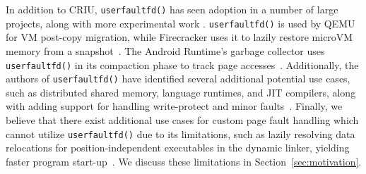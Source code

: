 


In addition to CRIU, \texttt{userfaultfd()} has seen adoption in a number of large projects, along with more experimental work \cite{zIO, LightSwap, file-backed-article, file-backed-proceeding, uffd-security-framework-paper, TrailDB}. \texttt{userfaultfd()} is used by QEMU for VM post-copy migration, while Firecracker uses it to lazily restore microVM memory from a snapshot~\cite{firecracker}. The Android Runtime's garbage collector uses \texttt{userfaultfd()} in its compaction phase to track page accesses~\cite{Android_13_AOSP, garbage_collection_paper}.
Additionally, the authors of \texttt{userfaultfd()} have identified several additional potential use cases, such as distributed shared memory, language runtimes, and JIT compilers, along with adding support for handling write-protect and minor faults~\cite{LWN_Write-protect, LWN_next_step, LPC-presentation, uffd_presentation}.
Finally, we believe that there exist additional use cases for custom page fault handling which cannot utilize \texttt{userfaultfd()} due to its limitations, such as lazily resolving data relocations for position-independent executables in the dynamic linker, yielding faster program start-up~\cite{chromium-elf}.
We discuss these limitations in Section~\ref{sec:motivation}.

